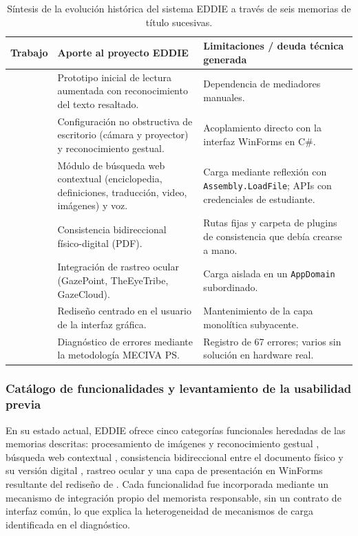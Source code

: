 \begin{table}[H]
\centering
\caption{Síntesis de la evolución histórica del sistema EDDIE a través de seis memorias de título sucesivas.}
\label{tab:evolucion}
\small
\begin{tabularx}{\textwidth}{p{3.2cm} X X}
\toprule
\textbf{Trabajo} & \textbf{Aporte al proyecto EDDIE} & \textbf{Limitaciones / deuda técnica generada} \\ \midrule
\citet{carrasco2017} & Prototipo inicial de lectura aumentada con reconocimiento del texto resaltado. & Dependencia de mediadores manuales. \\ \midrule
\citet{contreras2019} & Configuración no obstructiva de escritorio (cámara y proyector) y reconocimiento gestual. & Acoplamiento directo con la interfaz WinForms en C\#. \\ \midrule
\citet{montanares2019} & Módulo de búsqueda web contextual (enciclopedia, definiciones, traducción, video, imágenes) y voz. & Carga mediante reflexión con \texttt{Assembly.LoadFile}; APIs con credenciales de estudiante. \\ \midrule
\citet{pezoa2020} & Consistencia bidireccional físico-digital (PDF). & Rutas fijas y carpeta de plugins de consistencia que debía crearse a mano. \\ \midrule
\citet{estay2020} & Integración de rastreo ocular (GazePoint, TheEyeTribe, GazeCloud). & Carga aislada en un \texttt{AppDomain} subordinado. \\ \midrule
\citet{santibanez2020} & Rediseño centrado en el usuario de la interfaz gráfica. & Mantenimiento de la capa monolítica subyacente. \\ \midrule
\citet{ibaceta2023} & Diagnóstico de errores mediante la metodología MECIVA PS. & Registro de 67 errores; varios sin solución en hardware real. \\ \bottomrule
\end{tabularx}
\end{table}

\subsubsection{Catálogo de funcionalidades y levantamiento de la usabilidad previa}

En su estado actual, EDDIE ofrece cinco categorías funcionales heredadas de las memorias descritas: procesamiento de imágenes y reconocimiento gestual \citep{contreras2019}, búsqueda web contextual \citep{montanares2019}, consistencia bidireccional entre el documento físico y su versión digital \citep{pezoa2020}, rastreo ocular \citep{estay2020} y una capa de presentación en WinForms resultante del rediseño de \citet{santibanez2020}. Cada funcionalidad fue incorporada mediante un mecanismo de integración propio del memorista responsable, sin un contrato de interfaz común, lo que explica la heterogeneidad de mecanismos de carga identificada en el diagnóstico.


